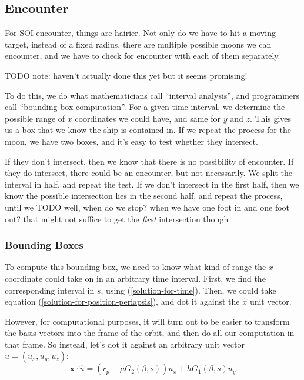 \documentclass{article}
\numberwithin{equation}{subsection}
\begin{document}
\subsection{Encounter}

For SOI encounter, things are hairier. Not only do we have to hit a moving target, instead of a fixed radius, there are multiple possible moons we can encounter, and we have to check for encounter with each of them separately.

TODO note: haven't actually done this yet but it seems promising!

To do this, we do what mathematicians call ``interval analysis'', and programmers call ``bounding box computation''. For a given time interval, we determine the possible range of $x$ coordinates we could have, and same for $y$ and $z$. This gives us a box that we know the ship is contained in. If we repeat the process for the moon, we have two boxes, and it's easy to test whether they intersect.

If they don't intersect, then we know that there is no possibility of encounter. If they do intersect, there could be an encounter, but not necessarily. We split the interval in half, and repeat the test. If we don't intersect in the first half, then we know the possible intersection lies in the second half, and repeat the process, until we TODO well, when do we stop? when we have one foot in and one foot out? that might not suffice to get the \textit{first} intersection though

\subsubsection*{Bounding Boxes}

To compute this bounding box, we need to know what kind of range the $x$ coordinate could take on in an arbitrary time interval. First, we find the corresponding interval in $s$, using (\ref{solution-for-time}). Then, we could take equation (\ref{solution-for-position-periapsis}), and dot it against the $\hat x$ unit vector.

However, for computational purposes, it will turn out to be easier to transform the basis vectors into the frame of the orbit, and then do all our computation in that frame. So instead, let's dot it against an arbitrary unit vector $\hat{u} = (u_x, u_y, u_z)$:
\begin{equation}
\bm x \cdot \hat{u} = (r_p - \mu G_2(\beta, s)) u_x + h G_1(\beta, s) u_y
\end{equation}
\end{document}

